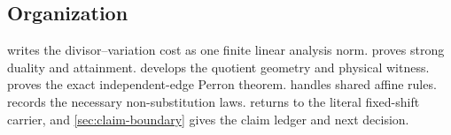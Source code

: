 \subsection{Organization}

 writes the divisor--variation cost as one
finite linear analysis norm.   proves strong
duality and attainment.   develops the
quotient geometry and physical witness.  
proves the exact independent-edge Perron theorem.
 handles shared affine rules.
 records the necessary non-substitution laws.
 returns to the literal fixed-shift carrier, and
\cref{sec:claim-boundary} gives the claim ledger and next decision.
